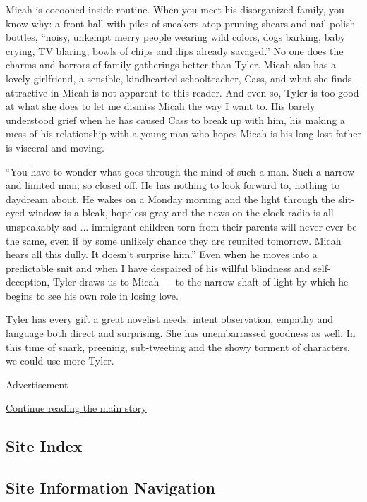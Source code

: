 Micah is cocooned inside routine. When you meet his disorganized family,
you know why: a front hall with piles of sneakers atop pruning shears
and nail polish bottles, ``noisy, unkempt merry people wearing wild
colors, dogs barking, baby crying, TV blaring, bowls of chips and dips
already savaged.'' No one does the charms and horrors of family
gatherings better than Tyler. Micah also has a lovely girlfriend, a
sensible, kindhearted schoolteacher, Cass, and what she finds attractive
in Micah is not apparent to this reader. And even so, Tyler is too good
at what she does to let me dismiss Micah the way I want to. His barely
understood grief when he has caused Cass to break up with him, his
making a mess of his relationship with a young man who hopes Micah is
his long-lost father is visceral and moving.

``You have to wonder what goes through the mind of such a man. Such a
narrow and limited man; so closed off. He has nothing to look forward
to, nothing to daydream about. He wakes on a Monday morning and the
light through the slit-eyed window is a bleak, hopeless gray and the
news on the clock radio is all unspeakably sad ... immigrant children
torn from their parents will never ever be the same, even if by some
unlikely chance they are reunited tomorrow. Micah hears all this dully.
It doesn't surprise him.'' Even when he moves into a predictable snit
and when I have despaired of his willful blindness and self-deception,
Tyler draws us to Micah --- to the narrow shaft of light by which he
begins to see his own role in losing love.

Tyler has every gift a great novelist needs: intent observation, empathy
and language both direct and surprising. She has unembarrassed goodness
as well. In this time of snark, preening, sub-tweeting and the showy
torment of characters, we could use more Tyler.

Advertisement

\protect\hyperlink{after-bottom}{Continue reading the main story}

\hypertarget{site-index}{%
\subsection{Site Index}\label{site-index}}

\hypertarget{site-information-navigation}{%
\subsection{Site Information
Navigation}\label{site-information-navigation}}

